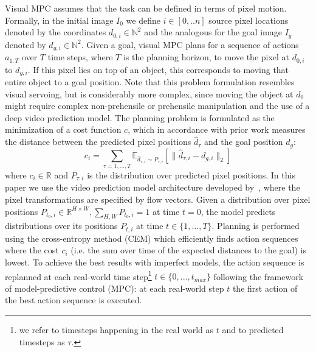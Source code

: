 Visual MPC assumes that the task can be defined in terms of pixel motion. Formally, in the initial image $I_0$ we define $i \in [0,..n]$ source pixel locations denoted by the coordinates $d_{0,i} \in \mathbb{N}^2$ and the analogous for the goal image $I_g$ denoted by $d_{g,i} \in \mathbb{N}^2$. Given a goal, visual MPC plans for a sequence of actions $a_{1:T}$ over $T$ time steps, where $T$ is the planning horizon, to move the pixel at $d_{0,i}$ to $d_{g,i}$. If this pixel lies on top of an object, this corresponds to moving that entire object to a goal position. Note that this problem formulation resembles visual servoing, but is considerably more complex, since moving the object at $d_0$ might require complex non-prehensile or prehensile manipulation and the use of a deep video prediction model.
The planning problem is formulated as the minimization of a cost function $c$, which in accordance with prior work \cite{sna} measures the distance between the predicted pixel positions $\hat{d}_{\tau}$ and the goal position $d_g$:
\begin{equation}
c_i  = \sum_{\tau = 1, \dots, T} \mathbb{E}_{\hat{d}_{\tau,i} \sim P_{\tau,i}} \left[\|\hat{d}_{\tau,i} - d_{g,i}\|_2\right]  
\label{eq:cost}
\end{equation}
where $c_i \in \mathbb{R}$ and $P_{\tau,i}$ is the distribution over predicted pixel positions. In this paper we use the video prediction model architecture developed by~\citet{savp}, where the pixel transformations are specified by flow vectors.
Given a distribution over pixel positions \mbox{$P_{t_0,i}\in\mathbb{R}^{H\times W}, \sum_{H,W} P_{t_0,i} = 1$} at time $t = 0$, the model predicts distributions over its positions $P_{t,i}$ at time $t \in \{ 1, \dots, T \}$. Planning is performed using the cross-entropy method (CEM) \cite{cem-rk-13} which efficiently finds action sequences where the cost $c_i$ (i.e. the sum over time of the expected distances to the goal) is lowest.
To achieve the best results with imperfect models, the action sequence is replanned at each real-world time step\footnote{we refer to timesteps happening in the real world as $t$ and to predicted timesteps as $\tau$.} $t \in \{0,...,t_{max}\}$ following the framework of model-predictive control (MPC): at each real-world step $t$ the first action of the best action sequence is executed. 
